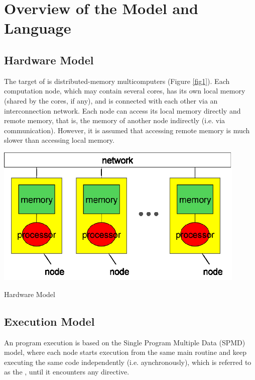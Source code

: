 \chapter{Overview of the {\XMP} Model and Language}

\section{Hardware Model}

The target of {\XMP} is distributed-memory multicomputers (Figure
\ref{fig1}). Each computation node, which may contain several cores, has
its own local memory (shared by the cores, if any), and is connected
with each other via an interconnection network.
%
Each node can access its local memory directly and remote memory, that
is, the memory of another node indirectly (i.e. via
communication). However, it is assumed that accessing remote memory is 
much slower than accessing local memory.

\begin{myfigure}
\includegraphics[width=12cm]{figs/Fig1.eps}
  \caption{Hardware Model}\label{fig1}
\end{myfigure}

\section{Execution Model}

An {\XMP} program execution is based on the Single Program Multiple Data
(SPMD) model, where each node starts execution from the same main
routine and keep executing the same code independently
(i.e. aynchronously), which is referred to as the {\it {}}, until it encounters any {\XMP} directive.

%

